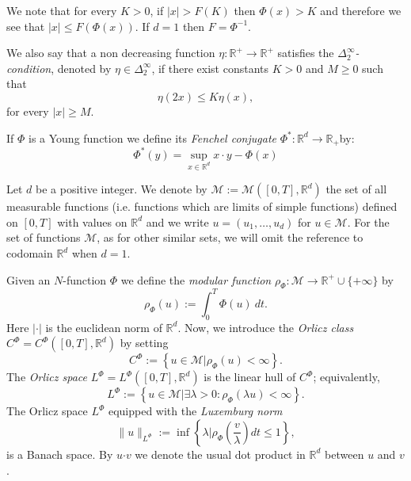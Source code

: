 \documentclass[twoside]{article}
\theoremstyle{remark}
\newcommand{\orlnor}{\|_{L^{\Phi}}}
\newcommand{\lphi}{L^{\Phi}}
\newcommand{\claseor}{C^{\Phi}}
\renewcommand{\b}[1]{\boldsymbol{#1}}
\newcommand{\rr}{\mathbb{R}}
\renewcommand{\leq}{\leqslant}
\renewcommand{\geq}{\geqslant}
\begin{document}
We note that  for every $K>0$, if $|x|>F(K)$ 
then $\Phi(x)> K$ and therefore we see that  $|x|\leq F(\Phi(x))$. If $d=1$ 
then $F=\Phi^{-1}$.





We also say that a non decreasing function $\eta:\mathbb{R}^+\rightarrow \mathbb{R}^+$ satisfies the  \emph{$\Delta_2^{\infty}$-condition}, denoted by $\eta \in \Delta_2^{\infty}$,
if there exist  constants $K>0$ and  $M\geq 0$ such that
\begin{equation}\label{delta2defi}\eta(2x)\leq K\eta(x),
\end{equation}
for every $|x|\geq M$.


If $\Phi$ is a Young function we define its \emph{Fenchel conjugate}   $\Phi^*:\mathbb{R}^d\to \mathbb{R}_+ $by:
\begin{equation}\label{eq:conjugada}
 \Phi^*(y)=\sup\limits_{x\in\mathbb{R}^d} x\cdot y-\Phi(x)
\end{equation}


Let $d$ be a positive integer. We denote by $\mathcal{M}:=\mathcal{M}([0,T],\rr^d)$  the set of all measurable functions (i.e. functions which are limits of simple functions)  defined on $[0,T]$ with values on $\mathbb{R}^d$ and  we write $u=(u_1,\dots,u_d)$ for  $u\in \mathcal{M}$. For the set of functions $\mathcal{M}$, as for other similar sets, we will omit the reference to codomain $\mathbb{R}^d$ when $d=1$.


Given  an $N$-function $\Phi$ we define the \emph{modular function} 
$\rho_{\Phi}:\mathcal{M}\to \mathbb{R}^+\cup\{+\infty\}$ by
\[\rho_{\Phi}(u):= \int_0^T \Phi(u)\ dt.\]
Here $|\cdot|$ is the euclidean norm of $\mathbb{R}^d$.
Now, we introduce the \emph{Orlicz class} $C^{\Phi}=C^{\Phi}([0,T],\rr^d)$   by setting
\begin{equation}\label{claseOrlicz}
  C^{\Phi}:=\left\{u\in \mathcal{M} | \rho_{\Phi}(u)< \infty \right\}.
\end{equation}
The \emph{Orlicz space} $\lphi=L^{\Phi}([0,T],\rr^d)$ is the linear hull of $\claseor$;
equivalently,
\begin{equation}\label{espacioOrlicz}
\lphi:=\left\{ u\in \mathcal{M}| \exists \lambda>0: \rho_{\Phi}(\lambda u) < \infty   \right\}.
\end{equation}
  The Orlicz space $\lphi$ equipped with the \emph{Luxemburg norm}
\[
\|  u  \orlnor:=\inf \left\{ \lambda\bigg| \rho_{\Phi}\left(\frac{v}{\lambda}\right) dt\leq 1\right\},
\]
is a Banach space. By $u\b{\cdot} v$ we denote the usual dot product in $\mathbb{R}^{d}$ between $u$ and $v$.
\end{document}
